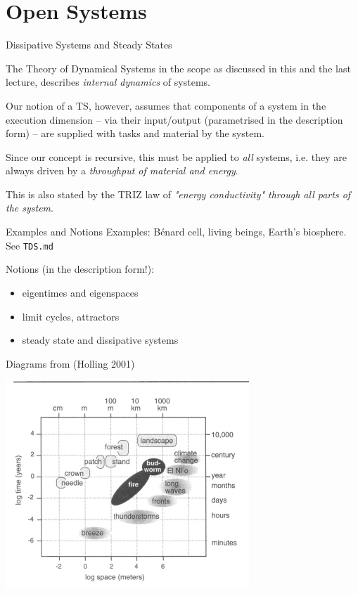 \documentclass{beamer}
\title{Modelling Sustainable Systems\\ and Semantic Web\\[6pt]
  Development of Systems and Their Components
  \vskip1em}
\subtitle{Lecture in the Module 10-202-2309\\ for Master Computer Science}
\author{Prof. Dr. Hans-Gert Gräbe\\
\url{http://www.informatik.uni-leipzig.de/~graebe}}
\date{May 2021}
\begin{document}
{
\begin{frame}
  \titlepage
\end{frame}}

\section{Open Systems}
\begin{frame}{Dissipative Systems and Steady States}

  The Theory of Dynamical Systems in the scope as discussed in this and the
  last lecture, describes \emph{internal dynamics} of systems.

  Our notion of a TS, however, assumes that components of a system in the
  execution dimension -- via their input/output (parametrised in the
  description form) -- are supplied with tasks and material by the system.

  Since our concept is recursive, this must be applied to \emph{all} systems,
  i.e.  they are always driven by a \emph{throughput of material and energy}.

  This is also stated by the TRIZ law of \emph{"energy conductivity" through
    all parts of the system}.
\end{frame}

\begin{frame}{Examples and Notions}
  Examples: Bénard cell, living beings, Earth's biosphere.  See
  \texttt{TDS.md}

  Notions (in the description form!): 
  \begin{itemize}
  \item eigentimes and eigenspaces
  \item limit cycles, attractors
  \item steady state and dissipative systems
  \end{itemize}
\end{frame}

\begin{frame}{Diagrams from (Holling 2001)}
  \begin{center}
    \includegraphics[width=.75\textwidth]{Holling-1.png}
  \end{center}
\end{frame}
\end{document}
